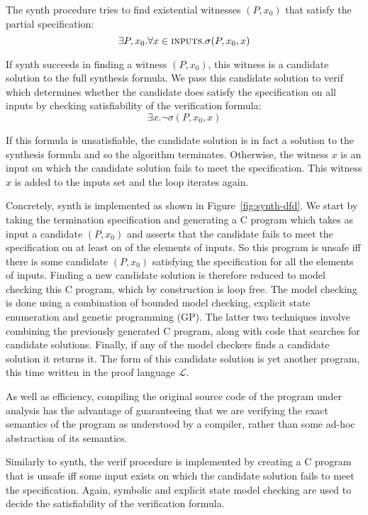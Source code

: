 \documentclass[preprint]{sigplanconf}
\theoremstyle{definition}
\begin{document}
The {\sc synth} procedure tries to find existential witnesses $(P, x_0)$
that satisfy the partial specification:
%
\[
 \exists P, x_0 . \forall x \in \text{\sc inputs} . \sigma(P, x_0, x)
\]

If {\sc synth} succeeds in finding a witness $(P, x_0)$, this witness is a
candidate solution to the full synthesis formula.  We pass this candidate
solution to {\sc verif} which determines whether the candidate does satisfy
the specification on all inputs by checking satisfiability of the
verification formula:
%
\[
 \exists x . \lnot \sigma(P, x_0, x)
\]

If this formula is unsatisfiable, the candidate solution is in fact a
solution to the synthesis formula and so the algorithm terminates. 
Otherwise, the witness $x$ is an input on which the candidate solution fails
to meet the specification.  This witness $x$ is added to the {\sc inputs}
set and the loop iterates again.

Concretely, {\sc synth} is implemented as shown in
Figure~\ref{fig:synth-dfd}.  We start by taking the termination
specification and generating a C program which takes as input a candidate
$(P, x_0)$ and asserts that the candidate fails to meet the specification on
at least on of the elements of {\sc inputs}.  So this program is unsafe iff
there is some candidate $(P, x_0)$ satisfying the specification for all the
elements of {\sc inputs}.  Finding a new candidate solution is therefore
reduced to model checking this C program, which by construction is loop
free.  The model checking is done using a combination of bounded model
checking, explicit state enumeration and genetic programming (GP).  The
latter two techniques involve combining the previously generated C program,
along with code that searches for candidate solutions.  Finally, if any of
the model checkers finds a candidate solution it returns it.  The form of
this candidate solution is yet another program, this time written in the
proof language $\mathcal{L}$.

As well as efficiency, compiling the original source code of the program
under analysis has the advantage of guaranteeing that we are verifying the
exact semantics of the program as understood by a compiler, rather than some
ad-hoc abstraction of its semantics.

Similarly to {\sc synth}, the {\sc verif} procedure is implemented by
creating a C program that is unsafe iff some input exists on which the
candidate solution fails to meet the specification.  Again, symbolic and
explicit state model checking are used to decide the satisfiability of the
verification formula.
\end{document}
